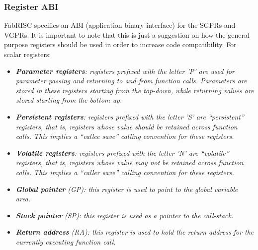 \documentclass{article}
\begin{document}
            \vspace{10pt}
            
            \vspace{10pt}

            \subsubsection{Register ABI}

                \vspace{10pt}

                FabRISC specifies an ABI (application binary interface) for the SGPRs and VGPRs. It is important to note that this is just a suggestion on how the general purpose registers should be used in order to increase code compatibility. For scalar registers:

                \begin{itemize}

                    \item \textit{\textbf{Parameter registers}: registers prefixed with the letter 'P' are used for parameter passing and returning to and from function calls. Parameters are stored in these registers starting from the top-down, while returning values are stored starting from the bottom-up.}

                    \item \textit{\textbf{Persistent registers}: registers prefixed with the letter 'S' are ``persistent'' registers, that is, registers whose value should be retained across function calls. This implies a ``callee save'' calling convention for these registers.}

                    \item \textit{\textbf{Volatile registers}: registers prefixed with the letter 'N' are ``volatile'' registers, that is, registers whose value may not be retained across function calls. This implies a ``caller save'' calling convention for these registers.}

                    \item \textit{\textbf{Global pointer} (GP): this register is used to point to the global variable area.}
                    \item \textit{\textbf{Stack pointer} (SP): this register is used as a pointer to the call-stack.}
                    \item \textit{\textbf{Return address} (RA): this register is used to hold the return address for the currently executing function call.}

                \end{itemize}
\end{document}
